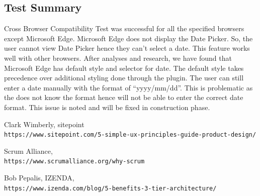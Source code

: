 \documentclass{article}
\begin{document}
\subsection{Test Summary}
Cross Browser Compatibility Test was successful for all the specified browsers except Microsoft Edge. Microsoft Edge does not display the Date Picker. So, the user cannot view Date Picker hence they can’t select a date. This feature works well with other browsers. After analyses and research, we have found that Microsoft Edge has default style and selector for date. The default style takes precedence over additional styling done through the plugin. The user can still enter a date manually with the format of “yyyy/mm/dd”. This is problematic as the does not know the format hence will not be able to enter the correct date format. This issue is noted and will be fixed in construction phase.

\begin{thebibliography}{9}
Clark Wimberly, sitepoint \\
\texttt{https://www.sitepoint.com/5-simple-ux-principles-guide-product-design/}

Scrum Alliance, \\
\texttt{https://www.scrumalliance.org/why-scrum}

Bob Pepalis, IZENDA, \\
\texttt{https://www.izenda.com/blog/5-benefits-3-tier-architecture/}

\end{thebibliography}
\end{document}
